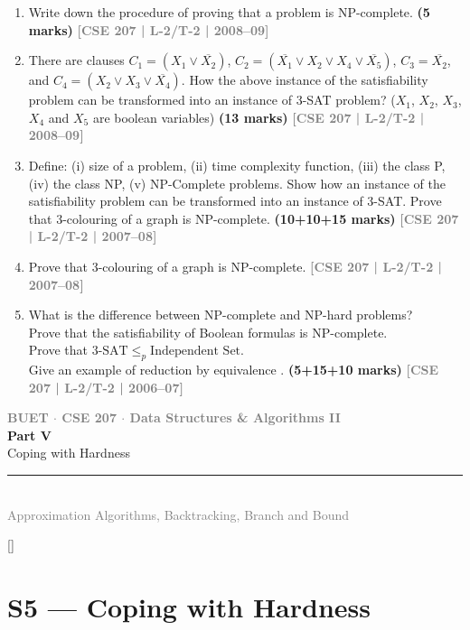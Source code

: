 \documentclass[12pt,a3paper]{article}
\newcommand{\yr}[1]{\hfill\textcolor{gray}{\small\textbf{[#1]}}}
\newcommand{\mk}[1]{\textcolor{orange!70!black}{\small\textbf{(#1 marks)}}}
\newcommand{\secdivider}[5]{%
  \newpage\thispagestyle{empty}%
  \vspace*{\fill}%
  \begin{tcolorbox}[enhanced,colback=#4!7,colframe=#3,boxrule=1.5pt,arc=8pt,
    left=20pt,right=20pt,top=22pt,bottom=22pt,
    shadow={3pt}{-3pt}{0pt}{black!15}]
    \centering
    {\large\textcolor{gray}{\textbf{BUET $\cdot$ CSE 207 $\cdot$ Data Structures \& Algorithms II}}}\\[8pt]
    {\fontsize{26}{32}\selectfont\bfseries\textcolor{#3}{#1}}\\[6pt]
    {\fontsize{15}{19}\selectfont\textcolor{dgray}{#2}}\\[12pt]
    \textcolor{#3!60}{\rule{0.5\textwidth}{0.5pt}}\\[6pt]
    {\small\textcolor{gray}{#5}}
  \end{tcolorbox}%
  \vspace*{\fill}\newpage%
}
\begin{document}
\begin{enumerate}
\item Write down the procedure of proving that a problem is NP-complete. \mk{5}
\yr{CSE 207 | L-2/T-2 | 2008--09}


\item There are clauses $C_1 = (X_1 \vee \overline{X_2})$, $C_2 = (\overline{X_1} \vee X_2 \vee X_4 \vee \overline{X_5})$, $C_3 = \overline{X_2}$, and $C_4 = (X_2 \vee X_3 \vee \overline{X_4})$. How the above instance of the satisfiability problem can be transformed into an instance of 3-SAT problem? ($X_1$, $X_2$, $X_3$, $X_4$ and $X_5$ are boolean variables) \mk{13}
\yr{CSE 207 | L-2/T-2 | 2008--09}

\item Define: (i) size of a problem, (ii) time complexity function, (iii) the class P, (iv) the class NP, (v) NP-Complete problems. Show how an instance of the satisfiability problem can be transformed into an instance of 3-SAT. Prove that 3-colouring of a graph is NP-complete. \mk{10+10+15}
\yr{CSE 207 | L-2/T-2 | 2007--08}


\item Prove that 3-colouring of a graph is NP-complete.
\yr{CSE 207 | L-2/T-2 | 2007--08}

\item What is the difference between NP-complete and NP-hard problems? \\
Prove that the satisfiability of Boolean formulas is NP-complete.\\
 Prove that $3\text{-SAT} \leq_p \text{Independent Set}$. \\
 Give an example of reduction by equivalence .
 \mk{5+15+10}
\yr{CSE 207 | L-2/T-2 | 2006--07}


\end{enumerate}

\secdivider{Part V}{Coping with Hardness}{cE}{cE}{Approximation Algorithms, Backtracking, Branch and Bound}
\titleformat{\section}{\large\bfseries\color{cE}}{}{0em}{}[\titlerule]

\section{S5 --- Coping with Hardness}
\label{sec:S5}
\end{document}
